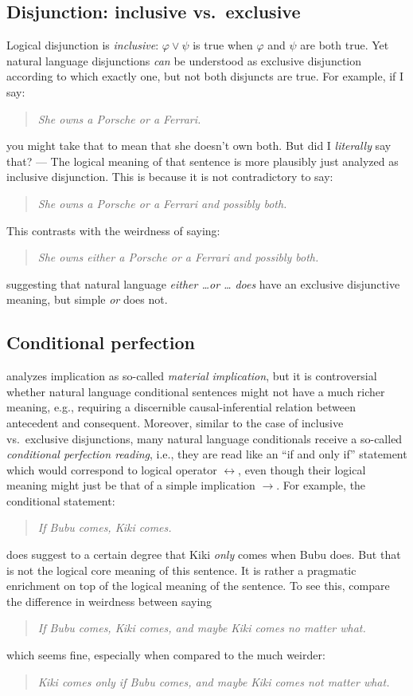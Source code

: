 \documentclass[nobib,nofonts]{tufte-handout}
\newcommand{\proplog}{\acro{PropLog}}
\begin{document}
\subsection{Disjunction: inclusive vs.~exclusive}

Logical disjunction is \emph{inclusive}: $\varphi \vee \psi$ is true when $\varphi$ and $\psi$ are both true.
Yet natural language disjunctions \emph{can} be understood as exclusive disjunction according to which exactly one, but not both disjuncts are true.
For example, if I say:
\begin{quote}
 \textit{She owns a Porsche or a Ferrari.}
\end{quote}
you might take that to mean that she doesn't own both.
But did I \emph{literally} say that?
--- The logical meaning of that sentence is more plausibly just analyzed as inclusive disjunction.
This is because it is not contradictory to say:
\begin{quote}
 \textit{She owns a Porsche or a Ferrari and possibly both.}
\end{quote}
This contrasts with the weirdness of saying:
\begin{quote}
 \textit{She owns \emph{either} a Porsche or a Ferrari and possibly both.}
\end{quote}
suggesting that natural language \emph{either \dots or \dots} \emph{does} have an exclusive disjunctive meaning, but simple \emph{or} does not.

\subsection{Conditional perfection}

\proplog analyzes implication as so-called \emph{material implication}, but it is controversial whether natural language conditional sentences might not have a much richer meaning, e.g., requiring a discernible causal-inferential relation between antecedent and consequent.
Moreover, similar to the case of inclusive vs.~exclusive disjunctions, many natural language conditionals receive a so-called \emph{conditional perfection reading}, i.e., they are read like an ``if and only if'' statement which would correspond to logical operator $\leftrightarrow$, even though their logical meaning might just be that of a simple implication $\rightarrow$.
For example, the conditional statement:
\begin{quote}
 \textit{If Bubu comes, Kiki comes.}
\end{quote}
does suggest to a certain degree that Kiki \emph{only} comes when Bubu does.
But that is not the logical core meaning of this sentence.
It is rather a pragmatic enrichment on top of the logical meaning of the sentence.
To see this, compare the difference in weirdness between saying
\begin{quote}
 \textit{If Bubu comes, Kiki comes, and maybe Kiki comes no matter what.}
\end{quote}
which seems fine, especially when compared to the much weirder:
\begin{quote}
 \textit{Kiki comes only if Bubu comes, and maybe Kiki comes not matter what.}
\end{quote}
\end{document}
